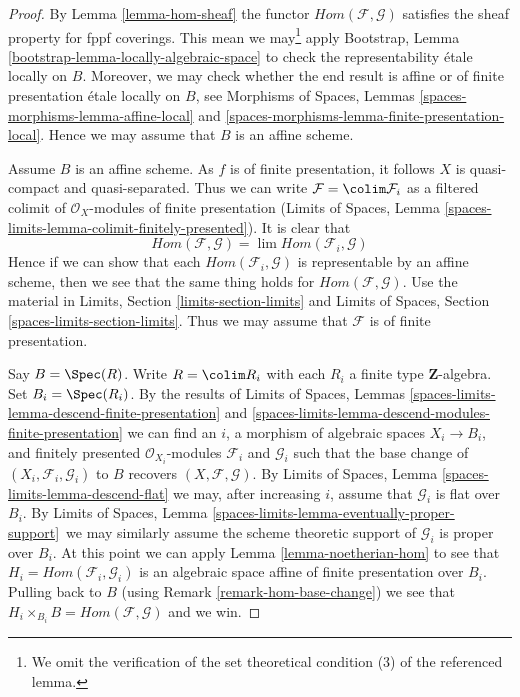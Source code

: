 \begin{proof}
By Lemma \ref{lemma-hom-sheaf} the functor
$\mathit{Hom}(\mathcal{F}, \mathcal{G})$ satisfies
the sheaf property for fppf coverings. This mean we may\footnote{We omit
the verification of the set theoretical condition (3) of the referenced
lemma.} apply
Bootstrap, Lemma \ref{bootstrap-lemma-locally-algebraic-space}
to check the representability \'etale locally on $B$. Moreover,
we may check whether the end result is affine or
of finite presentation \'etale locally on $B$, see
Morphisms of Spaces, Lemmas \ref{spaces-morphisms-lemma-affine-local} and
\ref{spaces-morphisms-lemma-finite-presentation-local}.
Hence we may assume that $B$ is an affine scheme.

\medskip\noindent
Assume $B$ is an affine scheme. As $f$ is of finite presentation, it follows
$X$ is quasi-compact and quasi-separated. Thus we can write
$\mathcal{F} = \colim \mathcal{F}_i$ as a filtered colimit of
$\mathcal{O}_X$-modules of finite presentation
(Limits of Spaces, Lemma \ref{spaces-limits-lemma-colimit-finitely-presented}).
It is clear that
$$
\mathit{Hom}(\mathcal{F}, \mathcal{G}) =
\lim \mathit{Hom}(\mathcal{F}_i, \mathcal{G})
$$
Hence if we can show that each $\mathit{Hom}(\mathcal{F}_i, \mathcal{G})$
is representable by an affine scheme, then we see that the same thing
holds for $\mathit{Hom}(\mathcal{F}, \mathcal{G})$. Use the material in
Limits, Section \ref{limits-section-limits} and
Limits of Spaces, Section \ref{spaces-limits-section-limits}.
Thus we may assume that $\mathcal{F}$ is of finite presentation.

\medskip\noindent
Say $B = \Spec(R)$. Write $R = \colim R_i$ with each $R_i$ a finite
type $\mathbf{Z}$-algebra. Set $B_i = \Spec(R_i)$. By the results of
Limits of Spaces, Lemmas
\ref{spaces-limits-lemma-descend-finite-presentation} and
\ref{spaces-limits-lemma-descend-modules-finite-presentation}
we can find an $i$, a morphism of algebraic spaces $X_i \to B_i$,
and finitely presented $\mathcal{O}_{X_i}$-modules $\mathcal{F}_i$ and
$\mathcal{G}_i$ such that the base change of
$(X_i, \mathcal{F}_i, \mathcal{G}_i)$ to $B$ recovers
$(X, \mathcal{F}, \mathcal{G})$. By
Limits of Spaces, Lemma \ref{spaces-limits-lemma-descend-flat}
we may, after increasing $i$, assume that $\mathcal{G}_i$
is flat over $B_i$. By
Limits of Spaces, Lemma \ref{spaces-limits-lemma-eventually-proper-support}\
we may similarly assume the scheme theoretic support of $\mathcal{G}_i$
is proper over $B_i$. At this point we can apply
Lemma \ref{lemma-noetherian-hom}
to see that $H_i = \mathit{Hom}(\mathcal{F}_i, \mathcal{G}_i)$ is
an algebraic space affine of finite presentation over $B_i$.
Pulling back to $B$ (using Remark \ref{remark-hom-base-change})
we see that $H_i \times_{B_i} B = \mathit{Hom}(\mathcal{F}, \mathcal{G})$ 
and we win.
\end{proof}






